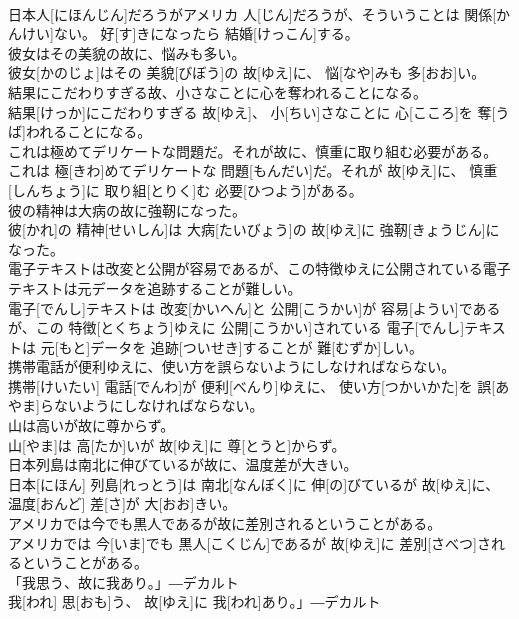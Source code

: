 \documentclass[8pt]{extreport}
\begin{document}
\begin{CJK}{UTF8}{min}
\\	日本人[にほんじん]だろうがアメリカ 人[じん]だろうが、そういうことは 関係[かんけい]ない。 好[す]きになったら 結婚[けっこん]する。
\\	彼女はその美貌の故に、悩みも多い。	
\\	彼女[かのじょ]はその 美貌[びぼう]の 故[ゆえ]に、 悩[なや]みも 多[おお]い。
\\	結果にこだわりすぎる故、小さなことに心を奪われることになる。	
\\	結果[けっか]にこだわりすぎる 故[ゆえ]、 小[ちい]さなことに 心[こころ]を 奪[うば]われることになる。
\\	これは極めてデリケートな問題だ。それが故に、慎重に取り組む必要がある。	
\\	これは 極[きわ]めてデリケートな 問題[もんだい]だ。それが 故[ゆえ]に、 慎重[しんちょう]に 取り組[とりく]む 必要[ひつよう]がある。
\\	彼の精神は大病の故に強靭になった。	
\\	彼[かれ]の 精神[せいしん]は 大病[たいびょう]の 故[ゆえ]に 強靭[きょうじん]になった。
\\	電子テキストは改変と公開が容易であるが、この特徴ゆえに公開されている電子テキストは元データを追跡することが難しい。	
\\	電子[でんし]テキストは 改変[かいへん]と 公開[こうかい]が 容易[ようい]であるが、この 特徴[とくちょう]ゆえに 公開[こうかい]されている 電子[でんし]テキストは 元[もと]データを 追跡[ついせき]することが 難[むずか]しい。
\\	携帯電話が便利ゆえに、使い方を誤らないようにしなければならない。	
\\	携帯[けいたい] 電話[でんわ]が 便利[べんり]ゆえに、 使い方[つかいかた]を 誤[あやま]らないようにしなければならない。
\\	山は高いが故に尊からず。	
\\	山[やま]は 高[たか]いが 故[ゆえ]に 尊[とうと]からず。
\\	日本列島は南北に伸びているが故に、温度差が大きい。	
\\	日本[にほん] 列島[れっとう]は 南北[なんぼく]に 伸[の]びているが 故[ゆえ]に、 温度[おんど] 差[さ]が 大[おお]きい。
\\	アメリカでは今でも黒人であるが故に差別されるということがある。	
\\	アメリカでは 今[いま]でも 黒人[こくじん]であるが 故[ゆえ]に 差別[さべつ]されるということがある。
\\	「我思う、故に我あり。」―デカルト	
\\	我[われ] 思[おも]う、 故[ゆえ]に 我[われ]あり。」―デカルト

\end{CJK}
\end{document}

